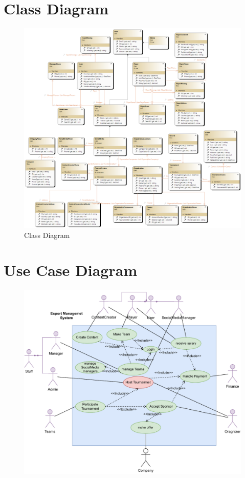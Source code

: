 \section{Class Diagram}
\hrulefill
\begin{figure}[H]
    \centering
    \includegraphics[width=1\textwidth]{diagrams/ClassDiagram1.png}
    \caption{Class Diagram}
    \label{fig:Class Diagram}
\end{figure}

\clearpage
\section{Use Case Diagram}
\hrulefill
\begin{figure}[h]
    \centering
    \vspace{3cm}
    \includegraphics[width=1\textwidth]{diagrams/Diagram-Usecase.drawio.pdf}
    \label{fig:Use Case Diagram}
\end{figure}


